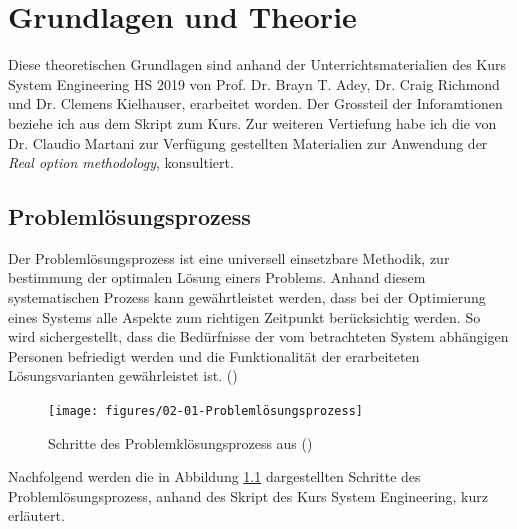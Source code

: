 %
%            
%
%
%

\chapter{Grundlagen und Theorie}
\label{chap:Grundlage}

Diese theoretischen Grundlagen sind anhand der Unterrichtsmaterialien des Kurs System Engineering HS 2019 von Prof. Dr. Brayn T. Adey, Dr. Craig Richmond und Dr. Clemens Kielhauser, erarbeitet worden. Der Grossteil der Inforamtionen beziehe ich aus dem Skript zum Kurs. Zur weiteren Vertiefung habe ich die von Dr. Claudio Martani zur Verfügung gestellten Materialien zur Anwendung der \textit{Real option methodology}, konsultiert.  

\section{Problemlösungsprozess}
\label{sec:Problemprozess}

Der Problemlösungsprozess ist eine universell einsetzbare Methodik, zur bestimmung der optimalen Lösung einers Problems. Anhand diesem systematischen Prozess kann gewährtleistet werden, dass bei der Optimierung eines Systems alle Aspekte zum richtigen Zeitpunkt berücksichtig werden. So wird sichergestellt, dass die Bedürfnisse der vom betrachteten System abhängigen Personen befriedigt werden und die Funktionalität der erarbeiteten Lösungsvarianten gewährleistet ist. (\cite{Adey2019}) 

\begin{figure}[h!]
	\centering
	\texttt{[image: figures/02-01-Problemlösungsprozess]}
	\caption[Schritte des Problemklösungsprozess]{Schritte des Problemklösungsprozess aus (\cite{Adey2019})}
	\label{img:Problemlösung}
\end{figure}

Nachfolgend werden die in Abbildung \ref{img:Problemlösung} dargestellten Schritte des Problemlösungsprozess, anhand des Skript des Kurs System Engineering, kurz erläutert. 

